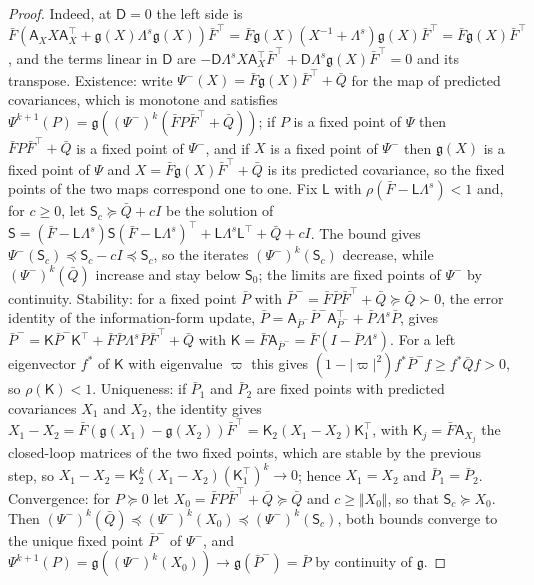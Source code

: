 \begin{proof}
Indeed, at $\mathsf D=0$ the left side is $\bar F(\mathsf A_XX\mathsf A_X^\top+\mathfrak g(X)\Lambda^s\mathfrak g(X))\bar F^\top=\bar F\mathfrak g(X)(X^{-1}+\Lambda^s)\mathfrak g(X)\bar F^\top=\bar F\mathfrak g(X)\bar F^\top$, and the terms linear in $\mathsf D$ are $-\mathsf D\Lambda^sX\mathsf A_X^\top\bar F^\top+\mathsf D\Lambda^s\mathfrak g(X)\bar F^\top=0$ and its transpose. Existence: write $\Psi^-(X)=\bar F\mathfrak g(X)\bar F^\top+\bar Q$ for the map of predicted covariances, which is monotone and satisfies $\Psi^{k+1}(P)=\mathfrak g((\Psi^-)^k(\bar FP\bar F^\top+\bar Q))$; if $P$ is a fixed point of $\Psi$ then $\bar FP\bar F^\top+\bar Q$ is a fixed point of $\Psi^-$, and if $X$ is a fixed point of $\Psi^-$ then $\mathfrak g(X)$ is a fixed point of $\Psi$ and $X=\bar F\mathfrak g(X)\bar F^\top+\bar Q$ is its predicted covariance, so the fixed points of the two maps correspond one to one. Fix $\mathsf L$ with $\rho(\bar F-\mathsf L\Lambda^s)<1$ and, for $c\ge0$, let $\mathsf S_c\succeq\bar Q+cI$ be the solution of $\mathsf S=(\bar F-\mathsf L\Lambda^s)\mathsf S(\bar F-\mathsf L\Lambda^s)^\top+\mathsf L\Lambda^s\mathsf L^\top+\bar Q+cI$. The bound gives $\Psi^-(\mathsf S_c)\preceq\mathsf S_c-cI\preceq\mathsf S_c$, so the iterates $(\Psi^-)^k(\mathsf S_c)$ decrease, while $(\Psi^-)^k(\bar Q)$ increase and stay below $\mathsf S_0$; the limits are fixed points of $\Psi^-$ by continuity. Stability: for a fixed point $\bar P$ with $\bar P^-=\bar F\bar P\bar F^\top+\bar Q\succeq\bar Q\succ0$, the error identity of the information-form update, $\bar P=\mathsf A_{\bar P^-}\bar P^-\mathsf A_{\bar P^-}^\top+\bar P\Lambda^s\bar P$, gives $\bar P^-=\mathsf K\bar P^-\mathsf K^\top+\bar F\bar P\Lambda^s\bar P\bar F^\top+\bar Q$ with $\mathsf K=\bar F\mathsf A_{\bar P^-}=\bar F(I-\bar P\Lambda^s)$. For a left eigenvector $f^\ast$ of $\mathsf K$ with eigenvalue $\varpi$ this gives $(1-\lvert\varpi\rvert^2)f^\ast\bar P^-f\ge f^\ast\bar Qf>0$, so $\rho(\mathsf K)<1$. Uniqueness: if $\bar P_1$ and $\bar P_2$ are fixed points with predicted covariances $X_1$ and $X_2$, the identity gives $X_1-X_2=\bar F(\mathfrak g(X_1)-\mathfrak g(X_2))\bar F^\top=\mathsf K_2(X_1-X_2)\mathsf K_1^\top$, with $\mathsf K_j=\bar F\mathsf A_{X_j}$ the closed-loop matrices of the two fixed points, which are stable by the previous step, so $X_1-X_2=\mathsf K_2^k(X_1-X_2)(\mathsf K_1^\top)^k\to0$; hence $X_1=X_2$ and $\bar P_1=\bar P_2$. Convergence: for $P\succeq0$ let $X_0=\bar FP\bar F^\top+\bar Q\succeq\bar Q$ and $c\ge\Vert X_0\Vert$, so that $\mathsf S_c\succeq X_0$. Then $(\Psi^-)^k(\bar Q)\preceq(\Psi^-)^k(X_0)\preceq(\Psi^-)^k(\mathsf S_c)$, both bounds converge to the unique fixed point $\bar P^-$ of $\Psi^-$, and $\Psi^{k+1}(P)=\mathfrak g((\Psi^-)^k(X_0))\to\mathfrak g(\bar P^-)=\bar P$ by continuity of $\mathfrak g$.
\end{proof}

